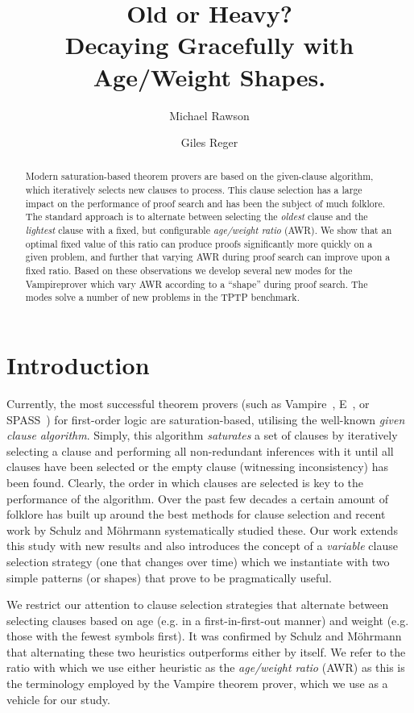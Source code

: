 \documentclass{llncs}
\title{Old or Heavy?\\Decaying Gracefully with Age/Weight Shapes.}
\author{Michael Rawson \and Giles Reger}
\institute{University of Manchester, Manchester, UK}
\newcommand{\sandm}{Schulz and M{\"{o}}hrmann}
\begin{document}
\maketitle
\begin{abstract}
Modern saturation-based theorem provers are based on the given-clause algorithm, which iteratively selects new clauses to process. This clause selection has a large impact on the performance of proof search and has been the subject of much folklore.  
The standard approach is to alternate between selecting the \emph{oldest} clause and the \emph{lightest} clause with a fixed, but configurable \emph{age/weight ratio} (AWR).
We show that an optimal fixed value of this ratio can produce proofs significantly more quickly on a given problem, and further that varying AWR during proof search can improve upon a fixed ratio.
Based on these observations we develop several new modes for the Vampireprover  which vary AWR according to a ``shape'' during proof search.
The modes solve a number of new problems in the TPTP benchmark.
\end{abstract}

\section{Introduction}
\label{sec:introduction}

Currently, the most successful theorem provers (such as Vampire~\cite{}, E~\cite{}, or SPASS~\cite{}) for first-order logic are saturation-based, utilising the well-known \emph{given clause algorithm}. Simply, this algorithm \emph{saturates} a set of clauses by iteratively selecting a clause and performing all non-redundant inferences with it until all clauses have been selected or the empty clause (witnessing inconsistency) has been found. Clearly, the order in which clauses are selected is key to the performance of the algorithm. Over the past few decades a certain amount of folklore has built up around the best methods for clause selection and recent work by \sandm{} \cite{DBLP:conf/cade/SchulzM16} systematically studied these. Our work extends this study with new results and also introduces the concept of a \emph{variable} clause selection strategy (one that changes over time) which we instantiate with two simple patterns (or shapes) that prove to be pragmatically useful.

We restrict our attention to clause selection strategies that alternate between selecting clauses based on age (e.g. in a first-in-first-out manner) and weight (e.g. those with the fewest symbols first). It was confirmed by \sandm{} that alternating these two heuristics outperforms either by itself. We refer to the ratio with which we use either heuristic as the \emph{age/weight ratio} (AWR) as this is the terminology employed by the Vampire theorem prover, which we use as a vehicle for our study.
\end{document}
